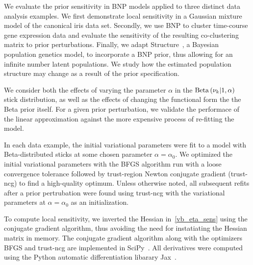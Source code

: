 We evaluate the prior sensitivity in BNP models applied to three distinct data analysis examples.
We first demonstrate local sensitivity in a Gaussian mixture model of the canonical iris data set.
Secondly, we use BNP to cluster time-course gene expression data
and evaluate the sensitivity of the resulting co-clustering matrix to prior perturbations.
Finally, we adapt Structure~\citep{pritchard:2000:structure}, a Bayesian population genetics model,
to incorporate a BNP prior, thus allowing for
an infinite number latent populations.
We study how the estimated population structure may change as a
result of the prior specification.

We consider both the effects of varying the parameter $\alpha$
in the $\mathrm{Beta}\left(\nu_{k} \vert 1, \alpha\right)$ stick distribution, as well as
the effects of changing the functional form the the Beta prior itself.
For a given prior perturbation,
we validate the performace of the linear approximation against
the more expensive process of re-fitting the model.

In each data example,
the initial variational parameters were fit to a model
with Beta-distributed sticks at some chosen parameter $\alpha = \alpha_0$.
We optimized the initial variational parameters with
the BFGS algorithm run with a loose convergence tolerance
followed by trust-region Newton conjugate gradient (trust-ncg) to find a high-quality optimum.
Unless otherwise noted, all subsequent refits after a prior pertrubation were found
using trust-ncg with the variational parameters at $\alpha = \alpha_0$ as an initialization.

To compute local sensitivity,
we inverted the Hessian in~\eqref{vb_eta_sens} using
the conjugate gradient algorithm, thus avoiding the need for
instatiating the Hessian matrix in memory.
The conjugate gradient algorithm along with the optimizers BFGS and trust-ncg
are implemented in SciPy~\citep{scipy}.
All derivatives were computed using the Python
automatic differentiation libarary Jax~\citep{jax2018github}.

